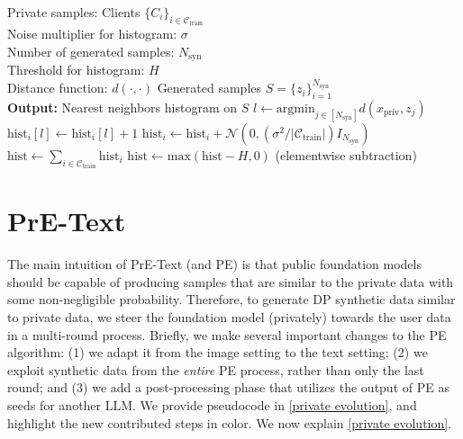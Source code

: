 \begin{algorithm}[t]
    \caption{\texttt{Histogram}}
    \begin{algorithmic}[1]
      Private samples: Clients $\{C_i\}_{i \in \mathcal{C}_{\text{train}}}$\\
     \hspace{\algorithmicindent} Noise multiplier for histogram: $\sigma$\\
     \hspace{\algorithmicindent} Number of generated samples: $N_{\text{syn}}$\\
     \hspace{\algorithmicindent} Threshold for histogram: $H$ \\
     \hspace{\algorithmicindent} Distance function: $d(\cdot, \cdot)$ 
     Generated samples $S = \{z_i\}_{i=1}^{N_{\text{syn}}}$ \\
     {\bfseries Output:} Nearest neighbors histogram on $S$
            \State $l \gets \text{argmin}_{j \in [N_{\text{syn}}]} d(x_{\text{priv}}, z_j)$ \label{line:dpnn}
            \State $\text{hist}_i[l] \gets \text{hist}_i[l] + 1$
        \EndFor
        \State $\text{hist}_i \gets \text{hist}_i + \mathcal{N}(0, (\sigma^2/|\mathcal{C}_{\text{train}}|) I_{N_{\text{syn}}})$ \label{line:dp}
    \EndFor
    \State $\text{hist} \gets \sum_{i \in \mathcal{C}_{\text{train}}} \text{hist}_i$ \label{line:collect} 
    \State $\text{hist} \gets \text{max}(\text{hist} - H, 0)$ \label{line:threshold} (elementwise subtraction)
    \State \Return {}
    \end{algorithmic}
    \label{algo:dphistogram}
\end{algorithm}
\section{PrE-Text}
\label{sec: alg description}
The main intuition of PrE-Text (and PE) is that public foundation models should be capable of producing samples that are similar to the private data with some non-negligible probability.  Therefore, to generate DP synthetic data similar to private data, we steer the foundation model (privately) towards the user data in a multi-round process.  Briefly, we make several important changes to the PE algorithm: (1) we adapt it from the image setting to the text setting; (2) we exploit synthetic data from the \emph{entire} PE process, rather than only the last round; and (3) we add a post-processing phase that utilizes the output of PE as seeds for another LLM. We provide pseudocode in \cref{private evolution}, and highlight the new contributed steps in color. We now explain \cref{private evolution}.


